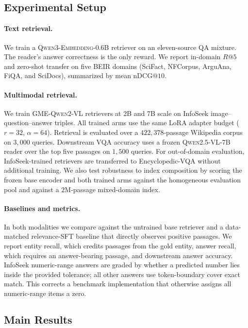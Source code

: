 

\subsection{Experimental Setup}
\label{sec:rag_setup}

\paragraph{Text retrieval.}
We train a \textsc{Qwen3-Embedding-0.6B} retriever on an eleven-source QA mixture. The reader's
answer correctness is the only reward. We report in-domain $R@5$ and zero-shot transfer on five
BEIR domains (SciFact, NFCorpus, ArguAna, FiQA, and SciDocs), summarized by mean nDCG@$10$.

\paragraph{Multimodal retrieval.}
We train \textsc{GME-Qwen2-VL} retrievers at 2B and 7B scale on InfoSeek image--question--answer
triples. All trained arms use the same LoRA adapter budget ($r{=}32$, $\alpha{=}64$). Retrieval is
evaluated over a $422{,}378$-passage Wikipedia corpus on $3{,}000$ queries. Downstream VQA accuracy
uses a frozen \textsc{Qwen2.5-VL-7B} reader over the top five passages on $1{,}500$ queries. For
out-of-domain evaluation, InfoSeek-trained retrievers are transferred to Encyclopedic-VQA without
additional training.
We also test robustness to index composition by scoring the frozen base encoder and both trained
arms against the homogeneous evaluation pool and against a $2$M-passage mixed-domain index.

\paragraph{Baselines and metrics.}
In both modalities we compare against the untrained base retriever and a data-matched relevance-SFT
baseline that directly observes positive passages. We report entity recall, which credits passages
from the gold entity, answer recall, which requires an answer-bearing passage, and downstream answer
accuracy. InfoSeek numeric-range answers are graded by whether a predicted number lies inside the
provided tolerance; all other answers use token-boundary cover exact match. This corrects a benchmark
implementation that otherwise assigns all numeric-range items a zero.

\subsection{Main Results}
\label{sec:rag_results}



